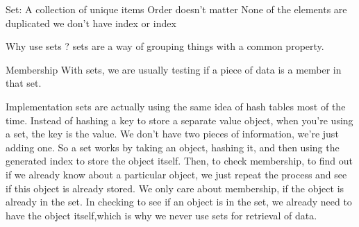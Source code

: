 Set: 
  A collection of unique items 
  Order doesn't matter
  None of the elements are duplicated
  we don't have index or index 

Why use sets ?
  sets are a way of grouping things with a common property. 

Membership
  With sets, we are usually testing if a piece of data is a member in that set.

Implementation 
  sets are actually using the same idea of hash tables most of the time. 
  Instead of hashing a key to store a separate value object, when you're using a set, the key is the value. 
  We don't have two pieces of information, we're just adding one. 
  So a set works by taking an object, hashing it, and then using the generated index to store the object itself. 
  Then, to check membership, to find out if we already know about a particular object, we just repeat the process and see if this object is already stored.
  We only care about membership, if the object is already in the set.
  In checking to see if an object is in the set, we already need to have the object itself,which is why we never use sets for retrieval of data.